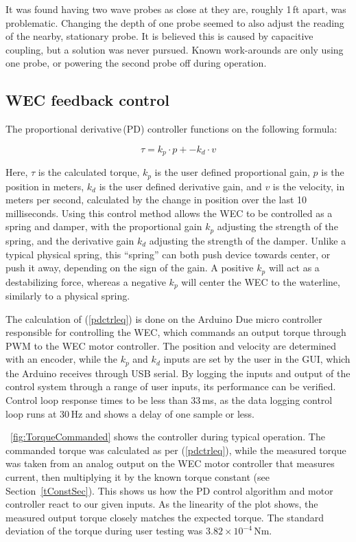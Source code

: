\documentclass[hardware,article,submit,pdftex,moreauthors]{Definitions/mdpi}
\begin{document}
It was found having two wave probes as close at they are, roughly 1\,ft apart, was problematic.
Changing the depth of one probe seemed to also adjust the reading of the nearby, stationary probe.
It is believed this is caused by capacitive coupling, but a solution was never pursued.
Known work-arounds are only using one probe, or powering the second probe off during operation.

\subsection{WEC feedback control}
The proportional derivative\,(PD) controller functions on the following formula:

\begin{equation}  \label{pdctrleq}
  \tau = k_p \cdot p + -k_d \cdot v
\end{equation}

Here, $\tau$ is the calculated torque, $k_p$ is the user defined proportional gain, $p$ is the position in meters, $k_d$ is the user defined derivative gain, and $v$ is the velocity, in meters per second, calculated by the change in position over the last 10 milliseconds. 
Using this control method allows the WEC to be controlled as a spring and damper, with the proportional gain $k_p$ adjusting the strength of the spring, and the derivative gain $k_d$ adjusting the strength of the damper.
Unlike a typical physical spring, this ``spring'' can both push device towards center, or push it away, depending on the sign of the gain.
A positive $k_p$ will act as a destabilizing force, whereas a negative $k_p$ will center the WEC to the waterline, similarly to a physical spring.

The calculation of (\ref{pdctrleq}) is done on the Arduino Due micro controller responsible for controlling the WEC, which commands an output torque through PWM to the WEC motor controller.
The position and velocity are determined with an encoder, while the $k_p$ and $k_d$ inputs are set by the user in the GUI, which the Arduino receives through USB serial.
By logging the inputs and output of the control system through a range of user inputs, its performance can be verified.
Control loop response times to be less than 33\,ms, as the data logging control loop runs at 30\,Hz and shows a delay of one sample or less.

\figurename~\ref{fig:TorqueCommanded} shows the controller during typical operation. 
The commanded torque was calculated as per (\ref{pdctrleq}), while the measured torque was taken from an analog output on the WEC motor controller that measures current, then multiplying it by the known torque constant (see Section~\ref{tConstSec}).
This shows us how the PD control algorithm and motor controller react to our given inputs.
As the linearity of the plot shows, the measured output torque closely matches the expected torque.
The standard deviation of the torque during user testing was $3.82 \times 10^{-4}$\,Nm.
\end{document}
